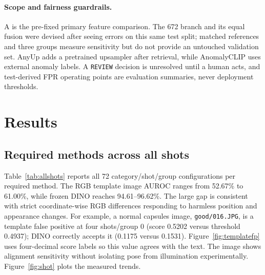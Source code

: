 \documentclass[times,10pt,twocolumn,letterpaper]{article}
\begin{document}
\paragraph{Scope and fairness guardrails.} A is the pre-fixed primary feature comparison. The 672 branch and its equal fusion were devised after seeing errors on this same test split; matched references and three groups measure sensitivity but do not provide an untouched validation set. AnyUp adds a pretrained upsampler after retrieval, while AnomalyCLIP uses external anomaly labels. A \texttt{REVIEW} decision is unresolved until a human acts, and test-derived FPR operating points are evaluation summaries, never deployment thresholds.

\section{Results}
\label{sec:results}
\subsection{Required methods across all shots}
Table~\ref{tab:allshots} reports all 72 category/shot/group configurations per required method. The RGB template image AUROC ranges from 52.67\% to 61.00\%, while frozen DINO reaches 94.61--96.62\%. The large gap is consistent with strict coordinate-wise RGB differences responding to harmless position and appearance changes. For example, a normal capsules image, \texttt{good/016.JPG}, is a template false positive at four shots/group 0 (score 0.5202 versus threshold 0.4937); DINO correctly accepts it (0.1175 versus 0.1531). Figure~\ref{fig:templatefp} uses four-decimal score labels so this value agrees with the text. The image shows alignment sensitivity without isolating pose from illumination experimentally. Figure~\ref{fig:shot} plots the measured trends.
\end{document}
